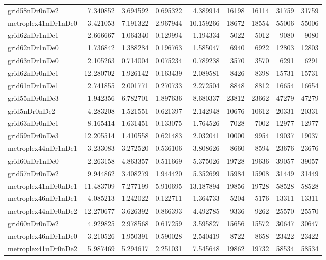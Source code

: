 \begin{longtable}{|l|r|r|r|r|r|r|r|r|}
grid58nDr0nDe2 & 7.340852 & 3.694592 & 0.695322 & 4.389914 & 16198 & 16114 & 31759 & 31759 \\
metroplex41nDr1nDe0 & 3.421053 & 7.191322 & 2.967944 & 10.159266 & 18672 & 18554 & 55006 & 55006 \\
grid62nDr1nDe1 & 2.666667 & 1.064340 & 0.129994 & 1.194334 & 5022 & 5012 & 9080 & 9080 \\
grid62nDr1nDe0 & 1.736842 & 1.388284 & 0.196763 & 1.585047 & 6940 & 6922 & 12803 & 12803 \\
grid63nDr1nDe0 & 2.105263 & 0.714004 & 0.075234 & 0.789238 & 3570 & 3570 & 6291 & 6291 \\
grid62nDr0nDe1 & 12.280702 & 1.926142 & 0.163439 & 2.089581 & 8426 & 8398 & 15731 & 15731 \\
grid61nDr1nDe1 & 2.741855 & 2.001771 & 0.270733 & 2.272504 & 8848 & 8812 & 16654 & 16654 \\
grid55nDr0nDe3 & 1.942356 & 6.782701 & 1.897636 & 8.680337 & 23812 & 23662 & 47279 & 47279 \\
grid5nDr0nDe2 & 4.283208 & 1.521551 & 0.621397 & 2.142948 & 10676 & 10612 & 20331 & 20331 \\
grid63nDr0nDe1 & 8.165414 & 1.631451 & 0.133075 & 1.764526 & 7028 & 7002 & 12977 & 12977 \\
grid59nDr0nDe3 & 12.205514 & 1.410558 & 0.621483 & 2.032041 & 10000 & 9954 & 19037 & 19037 \\
metroplex44nDr1nDe1 & 3.233083 & 3.272520 & 0.536106 & 3.808626 & 8660 & 8594 & 23676 & 23676 \\
grid60nDr1nDe0 & 2.263158 & 4.863357 & 0.511669 & 5.375026 & 19728 & 19636 & 39057 & 39057 \\
grid57nDr0nDe2 & 9.944862 & 3.408279 & 1.944420 & 5.352699 & 15984 & 15908 & 31449 & 31449 \\
metroplex41nDr0nDe1 & 11.483709 & 7.277199 & 5.910695 & 13.187894 & 19856 & 19728 & 58528 & 58528 \\
metroplex46nDr1nDe1 & 4.085213 & 1.242022 & 0.122711 & 1.364733 & 5204 & 5176 & 13311 & 13311 \\
metroplex44nDr0nDe2 & 12.270677 & 3.626392 & 0.866393 & 4.492785 & 9336 & 9262 & 25570 & 25570 \\
grid60nDr0nDe2 & 4.929825 & 2.978568 & 0.617259 & 3.595827 & 15656 & 15572 & 30647 & 30647 \\
metroplex46nDr1nDe0 & 3.210526 & 1.950391 & 0.590028 & 2.540419 & 8722 & 8658 & 23422 & 23422 \\
metroplex41nDr0nDe2 & 5.987469 & 5.294617 & 2.251031 & 7.545648 & 19862 & 19732 & 58534 & 58534 \\

\end{longtable}
